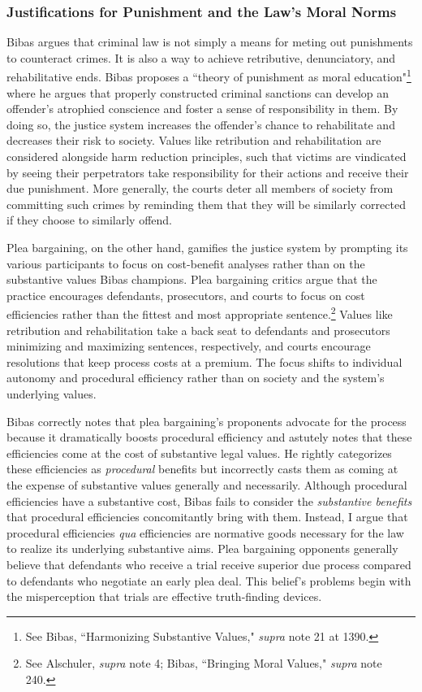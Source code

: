 \subsubsection{Justifications for Punishment and the Law's Moral Norms}

Bibas argues that criminal law is not simply a means for meting out punishments to counteract crimes. It is also a way to achieve retributive, denunciatory, and rehabilitative ends. Bibas proposes a ``theory of punishment as moral education"\footnote{See Bibas, ``Harmonizing Substantive Values," \textit{supra} note 21 at 1390.} where he argues that properly constructed criminal sanctions can develop an offender's atrophied conscience and foster a sense of responsibility in them. By doing so, the justice system increases the offender's chance to rehabilitate and decreases their risk to society. Values like retribution and rehabilitation are considered alongside harm reduction principles, such that victims are vindicated by seeing their perpetrators take responsibility for their actions and receive their due punishment. More generally, the courts deter all members of society from committing such crimes by reminding them that they will be similarly corrected if they choose to similarly offend. 

Plea bargaining, on the other hand, gamifies the justice system by prompting its various participants to focus on cost-benefit analyses rather than on the substantive values Bibas champions. Plea bargaining critics argue that the practice encourages defendants, prosecutors, and courts to focus on cost efficiencies rather than the fittest and most appropriate sentence.\footnote{See Alschuler, \textit{supra} note 4; Bibas, ``Bringing Moral Values," \textit{supra} note 240.} Values like retribution and rehabilitation take a back seat to defendants and prosecutors minimizing and maximizing sentences, respectively, and courts encourage resolutions that keep process costs at a premium. The focus shifts to individual autonomy and procedural efficiency rather than on society and the system's underlying values.

Bibas correctly notes that plea bargaining's proponents advocate for the process because it dramatically boosts procedural efficiency and astutely notes that these efficiencies come at the cost of substantive legal values. He rightly categorizes these efficiencies as \textit{procedural} benefits but incorrectly casts them as coming at the expense of substantive values generally and necessarily. Although procedural efficiencies have a substantive cost, Bibas fails to consider the \textit{substantive benefits} that procedural efficiencies concomitantly bring with them. Instead, I argue that procedural efficiencies \textit{qua} efficiencies are normative goods necessary for the law to realize its underlying substantive aims. Plea bargaining opponents generally believe that defendants who receive a trial receive superior due process compared to defendants who negotiate an early plea deal. This belief's problems begin with the misperception that trials are effective truth-finding devices.

